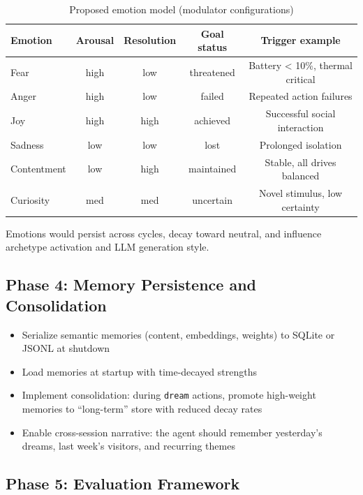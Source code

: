 \documentclass[11pt,oneside]{article}
\begin{document}
\begin{table}[H]
\centering
\caption{Proposed emotion model (modulator configurations)}
\label{tab:emotions}
\small
\begin{tabular}{l c c c c}
\toprule
\textbf{Emotion} & \textbf{Arousal} & \textbf{Resolution} & \textbf{Goal status} & \textbf{Trigger example} \\
\midrule
Fear        & high  & low  & threatened  & Battery < 10\%, thermal critical \\
Anger       & high  & low  & failed      & Repeated action failures \\
Joy         & high  & high & achieved    & Successful social interaction \\
Sadness     & low   & low  & lost        & Prolonged isolation \\
Contentment & low   & high & maintained  & Stable, all drives balanced \\
Curiosity   & med   & med  & uncertain   & Novel stimulus, low certainty \\
\bottomrule
\end{tabular}
\end{table}

Emotions would persist across cycles, decay toward neutral, and influence archetype activation and LLM generation style.

\subsection{Phase 4: Memory Persistence and Consolidation}

\begin{itemize}
  \item Serialize semantic memories (content, embeddings, weights) to SQLite or JSONL at shutdown
  \item Load memories at startup with time-decayed strengths
  \item Implement consolidation: during \texttt{dream} actions, promote high-weight memories to ``long-term'' store with reduced decay rates
  \item Enable cross-session narrative: the agent should remember yesterday's dreams, last week's visitors, and recurring themes
\end{itemize}

\subsection{Phase 5: Evaluation Framework}
\end{document}
